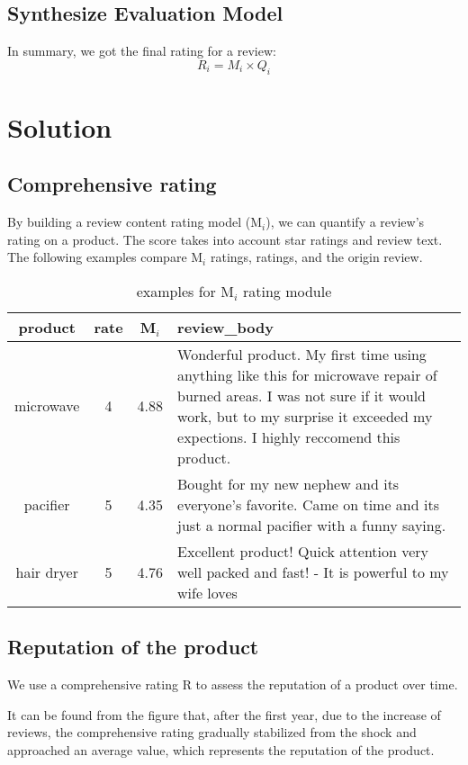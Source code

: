 \documentclass{mcmthesis}
\begin{document}
\subsection{Synthesize Evaluation Model}
In summary, we got the final rating for a review:
\[
 R_i = M_i \times Q_i
\]

\section{Solution}
\subsection{Comprehensive rating}

By building a review content rating model (M$_{i}$), we can quantify a review's rating on a product. The score takes into account star ratings and review text. The following examples compare M$_{i}$ ratings, ratings, and the origin review.

\begin{table}[h]
  \centering
  \begin{tabular}{cccp{10cm}}
    \hline
    product & rate & M$_{i}$ & review\_body \\
    \hline
    microwave & 4 & 4.88 & Wonderful product. My first time using anything like this for microwave repair of burned areas. I was not sure if it would work, but to my surprise it exceeded my expections. I highly reccomend this product.\\

    pacifier & 5 & 4.35 & Bought for my new nephew and its everyone's favorite. Came on time and its just a normal pacifier with a funny saying.\\

    hair dryer & 5 & 4.76 & Excellent product!  Quick attention very well packed and fast! - It is powerful to my wife loves\\
    \hline
  \end{tabular}
  \caption{examples for M$_{i}$ rating module}
\end{table}

\subsection{Reputation of the product}

We use a comprehensive rating R to assess the reputation of a product over time.


It can be found from the figure that, after the first year, due to the increase of reviews, the comprehensive rating gradually stabilized from the shock and approached an average value, which represents the reputation of the product.
\end{document}
